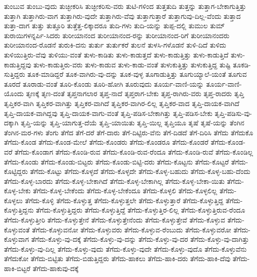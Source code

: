 {ತುಂಬುವ
ತುಂಬು-ವುದು
ತುಚ್ಛೀಕರಿಸಿ
ತುಚ್ಛೀಕರಿಸು-ವರು
ತುಟಿ-ಗಳಿಂದ
ತುತ್ತತುದಿ
ತುತ್ತನ್ನು
ತುತ್ತಾಗ-ಬೇಕಾಗುತ್ತಿತ್ತು
ತುತ್ತಾಗಿ
ತುತ್ತಾಗಿರು-ವಾಗ
ತುತ್ತಾಗಿರು-ವುದೇ
ತುತ್ತಾಗಿರು-ವೆವು
ತುತ್ತಾಗುತ್ತಾರೆ
ತುತ್ತಾಗುವು-ದಿಲ್ಲ-ವೆಂದು
ತುತ್ತಾದ
ತುತ್ತಾ-ದಾಗ
ತುತ್ತು
ತುತ್ತೂರಿ
ತುತ್ತೆತ್ತ-ಲಿಕ್ಕಾದರೂ
ತುದಿ-ಗಳು
ತುದಿ-ಯನ್ನು
ತುಪ್ಪ-ದಲ್ಲಿ
ತುಮುಲ
ತುಮ್
ತುರಾಯಿಗಳನ್ನರ್ಪಿ-ಸಿದರು
ತುರೀಯಾನಂದ
ತುರೀಯಾನಂದ-ರನ್ನು
ತುರೀಯಾನಂದ-ರಿಗೆ
ತುರೀಯಾನಂದರು
ತುರೀಯಾನಂದ-ರೊಡನೆ
ತುರುಕಿ-ದನು
ತುರ್ತು
ತುರ್ತುಕರೆ
ತುಲನೆ
ತುಳಸಿ-ಗಳೊಡನೆ
ತುಳಿ-ದಿದೆ
ತುಳಿದು
ತುಳಿಯುತ್ತಿರು-ವೆವು
ತುಳಿಯು-ವಂತೆ
ತುಳು-ಕಾಡಿತು
ತುಳು-ಕಾಡುತ್ತದೆ
ತುಳು-ಕಾಡುತ್ತಿತ್ತು
ತುಳು-ಕಾಡುತ್ತಿದೆ
ತುಳು-ಕಾಡುತ್ತಿದ್ದವು
ತುಳು-ಕಾಡುತ್ತಿರು-ವರು
ತುಳು-ಕಾಡುವ
ತುಳು-ಕಾಡು-ವಂತೆ
ತುಳುಕುತ್ತಿತ್ತು
ತುಳುಕುತ್ತಿದ್ದ
ತುಷ್ಟಿ
ತೂಕಡಿ-ಸುತ್ತಿದ್ದರು
ತೂಕ-ಮಾಡಿದ್ದರೆ
ತೂಕ-ವಾಗಿರು-ವು-ದನ್ನು
ತೂಕ-ವುಳ್ಳ
ತೂಗಾಡುತ್ತಿತ್ತು
ತೂಗುಯ್ಯಾಲೆ-ಯಂತೆ
ತೂಗುವ
ತೂರದೆ
ತೂರಾಡು-ವಂತೆ
ತೂರಿ-ಕೊಂಡು
ತೂರಿ-ಹೋಗಿ
ತೂರುವುದು
ತೂರ್ಯ-ವಾಣಿ-ಯನ್ನು
ತೂರ್ಯ-ವಾಣಿ-ಯೊಂದು
ತೃಣಕ್ಕೆ
ತೃಣ-ದಂತೆ
ತೃಪ್ತನಾಗಲಾರ
ತೃಪ್ತ-ನಾದೆ
ತೃಪ್ತರಾಗ-ಬೇಕು
ತೃಪ್ತ-ರಾಗಿರು-ವರು
ತೃಪ್ತ-ರಾದರು
ತೃಪ್ತಿ
ತೃಪ್ತಿಕರ-ವಾಗಿ
ತೃಪ್ತಿಕರ-ವಾಗಿತ್ತು
ತೃಪ್ತಿಕರ-ವಾಗಿದೆ
ತೃಪ್ತಿಕರ-ವಾಗಿರ-ಲಿಲ್ಲ
ತೃಪ್ತಿಕರ-ವಾದ
ತೃಪ್ತಿ-ದಾಯಕ-ವಾಗಿದೆ
ತೃಪ್ತಿ-ದಾಯಕ-ವಾಗಿದ್ದವು
ತೃಪ್ತಿ-ದಾಯಕ-ವಾಗು-ವಂತೆ
ತೃಪ್ತಿ-ಪಡಿಸ-ಬೇಕಾಗಿತ್ತು
ತೃಪ್ತಿ-ಪಡಿಸ-ಬೇಕು
ತೃಪ್ತಿ-ಪಡಿಸು-ವು-ದಕ್ಕಾಗಿ
ತೃಪ್ತಿ-ಯನ್ನು
ತೃಪ್ತಿ-ಯಾಗುತ್ತ-ದೆಯೆ
ತೃಪ್ತಿ-ಯಾಯಿತು
ತೃಪ್ತಿ-ಯಿಲ್ಲ
ತೃಪ್ತಿಯೂ
ತೃಷೆ
ತೃಷೆ-ಯನ್ನು
ತೆಂಗಿನ
ತೆಂಗಿನ-ಮರ-ಗಳು
ತೆಂಗು
ತೆಗೆದ
ತೆಗೆ-ದರೆ
ತೆಗೆ-ದಾರು
ತೆಗೆ-ದಿಟ್ಟಿರು-ವೆನು
ತೆಗೆ-ದಿಡದೆ
ತೆಗೆ-ದಿರಿಸಿ
ತೆಗೆದು
ತೆಗೆದುಕೊ
ತೆಗೆದು-ಕೊಂಡ
ತೆಗೆದು-ಕೊಂಡ-ಮೇಲೆ
ತೆಗೆದು-ಕೊಂಡರು
ತೆಗೆದು-ಕೊಂಡರೂ
ತೆಗೆದು-ಕೊಂಡರೆ
ತೆಗೆದು-ಕೊಂಡ-ವರೆ
ತೆಗೆದು-ಕೊಂಡಾಗ
ತೆಗೆದು-ಕೊಂಡಿ-ರುವ
ತೆಗೆದು-ಕೊಂಡಿ-ರುವ-ರೆಂದೂ
ತೆಗೆದು-ಕೊಂಡಿ-ರುವೆ
ತೆಗೆದು-ಕೊಂಡಿಲ್ಲ
ತೆಗೆದು-ಕೊಂಡು
ತೆಗೆದು-ಕೊಂಡು-ಬಿಟ್ಟರು
ತೆಗೆದು-ಕೊಂಡು-ಬಿಟ್ಟಿ-ದರು
ತೆಗೆದು-ಕೊಟ್ಟನು
ತೆಗೆದು-ಕೊಟ್ಟರೆ
ತೆಗೆದು-ಕೊಟ್ಟಿದ್ದರು
ತೆಗೆದು-ಕೊಟ್ಟು
ತೆಗೆದು-ಕೊಳ್ಳದೆ
ತೆಗೆದು-ಕೊಳ್ಳದೇ
ತೆಗೆದು-ಕೊಳ್ಳ-ಬಹುದು
ತೆಗೆದು-ಕೊಳ್ಳ-ಬಹು-ದೆಂದು
ತೆಗೆದು-ಕೊಳ್ಳ-ಬಾರದು
ತೆಗೆದು-ಕೊಳ್ಳ-ಬೇಕಾಗಿದೆ
ತೆಗೆದು-ಕೊಳ್ಳ-ಬೇಕಾಗಿಲ್ಲ
ತೆಗೆದು-ಕೊಳ್ಳ-ಬೇಕಾ-ಯಿತು
ತೆಗೆದು-ಕೊಳ್ಳ-ಬೇಕು
ತೆಗೆದು-ಕೊಳ್ಳ-ಬೇಕೆಂದು
ತೆಗೆದು-ಕೊಳ್ಳ-ಬೇಕೆಂದೂ
ತೆಗೆದು-ಕೊಳ್ಳಲಿ
ತೆಗೆದು-ಕೊಳ್ಳಲಿಲ್ಲ
ತೆಗೆದು-ಕೊಳ್ಳಲು
ತೆಗೆದು-ಕೊಳ್ಳಿ
ತೆಗೆದು-ಕೊಳ್ಳುತ್ತ
ತೆಗೆದು-ಕೊಳ್ಳುತ್ತಲೇ
ತೆಗೆದು-ಕೊಳ್ಳುತ್ತಾರೆ
ತೆಗೆದು-ಕೊಳ್ಳುತ್ತಿದ್ದ
ತೆಗೆದು-ಕೊಳ್ಳುತ್ತಿದ್ದನು
ತೆಗೆದು-ಕೊಳ್ಳುತ್ತಿದ್ದರು
ತೆಗೆದು-ಕೊಳ್ಳುತ್ತಿದ್ದೆ
ತೆಗೆದು-ಕೊಳ್ಳುತ್ತಿರ-ಲಿಲ್ಲ
ತೆಗೆದು-ಕೊಳ್ಳುತ್ತಿರುವ-ರೆಂದೂ
ತೆಗೆದು-ಕೊಳ್ಳುತ್ತೀರಿ
ತೆಗೆದು-ಕೊಳ್ಳುತ್ತೇನೆ
ತೆಗೆದು-ಕೊಳ್ಳುತ್ತೇನೆಂದು
ತೆಗೆದು-ಕೊಳ್ಳುತ್ತೇವೆ
ತೆಗೆದು-ಕೊಳ್ಳುವ
ತೆಗೆದು-ಕೊಳ್ಳುವಂತೆ
ತೆಗೆದು-ಕೊಳ್ಳುವನೋ
ತೆಗೆದು-ಕೊಳ್ಳುವರು
ತೆಗೆದು-ಕೊಳ್ಳುವ-ರೆಂಬುದು
ತೆಗೆದು-ಕೊಳ್ಳುವರೋ
ತೆಗೆದು-ಕೊಳ್ಳುವಾಗ
ತೆಗೆದು-ಕೊಳ್ಳು-ವು-ದಕ್ಕೆ
ತೆಗೆದು-ಕೊಳ್ಳು-ವು-ದನ್ನು
ತೆಗೆದು-ಕೊಳ್ಳು-ವು-ದರ
ತೆಗೆದು-ಕೊಳ್ಳು-ವು-ದಾಗಿತ್ತು
ತೆಗೆದು-ಕೊಳ್ಳು-ವು-ದಿಲ್ಲ
ತೆಗೆದು-ಕೊಳ್ಳು-ವುದು
ತೆಗೆದು-ಕೊಳ್ಳು-ವುದೇ
ತೆಗೆದು-ಕೊಳ್ಳು-ವುದೊ
ತೆಗೆದು-ಕೊಳ್ಳುವೆನು
ತೆಗೆದುಕೋ
ತೆಗೆದು-ಬಿಟ್ಟಿತು
ತೆಗೆದು-ಬಿಡುತ್ತಿದ್ದರು
ತೆಗೆದು-ಹಾಕಲು
ತೆಗೆದು-ಹಾಕಿ-ದರು
ತೆಗೆದು-ಹಾಕಿ-ದೆವು
ತೆಗೆದು-ಹಾಕಿ-ಬಿಟ್ಟರೆ
ತೆಗೆದು-ಹಾಕುವು-ದಕ್ಕೆ
}
